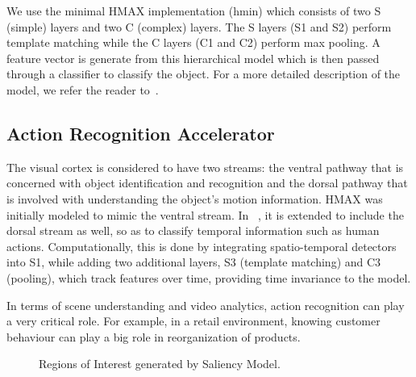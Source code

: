 We use the minimal HMAX implementation (hmin) which consists of two S (simple) layers and two C (complex) layers. The S layers (S1 and S2) perform template matching while the C layers (C1 and C2) perform max pooling. A feature vector is generate from this hierarchical model which is then passed through a classifier to classify the object. For a more detailed description of the model, we refer the reader to~\cite{Mutch2008}.

\subsection{Action Recognition Accelerator}
The visual cortex is considered to have two streams: the ventral pathway that is concerned with object identification and recognition and the dorsal pathway that is involved with understanding the object's motion information. HMAX was initially modeled to mimic the ventral stream. In ~\cite{action-recognition}, it is extended to include the dorsal stream as well, so as to classify temporal information such as human actions. Computationally, this is done by integrating spatio-temporal detectors into S1, while adding two additional layers, S3 (template matching) and C3 (pooling), which track features over time, providing time invariance to the model.

In terms of scene understanding and video analytics, action recognition can play a very critical role. For example, in a retail environment, knowing customer behaviour can play a big role in reorganization of products. 

\begin{figure}[ht!]
\centering
{}
\caption{\label{fig:RoIs_campus_000042} Regions of Interest generated by Saliency Model.}
\end{figure}


